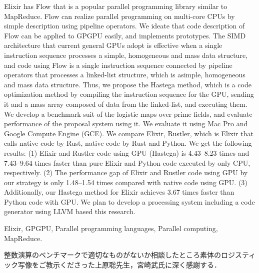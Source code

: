 \documentclass[submit,techrep]{ipsj}
\begin{document}
\begin{eabstract}
Elixir has Flow that is a popular parallel programming library similar to MapReduce. Flow can realize parallel programming on multi-core CPUs by simple description using pipeline operators. We ideate that code description of Flow can be applied to GPGPU easily, and implements prototypes. The SIMD architecture that current general GPUs adopt is effective when a single instruction sequence processes a simple, homogeneous and mass data structure, and code using Flow is a single instruction sequence connected by pipeline operators that processes a linked-list structure, which is asimple, homogeneous and mass data structure. Thus, we propose the Hastega method, which is a code optimization method by compiling the instruction sequence for the GPU, sending it and a mass array composed of data from the linked-list, and executing them. We develop a benchmark suit of the logistic maps over prime fields, and evaluate performance of the proposal system using it. We evaluate it using Mac Pro and Google Compute Engine (GCE). We compare Elixir, Rustler, which is Elixir that calls native code by Rust, native code by Rust and Python. We get the following results: (1) Elixir and Rustler code using GPU (Hastega) is 4.43--8.23 times and 7.43--9.64 times faster than pure Elixir and Python code executed by only CPU, respectively. (2) The performance gap of Elixir and Rustler code using GPU by our strategy is only 1.48--1.54 times compared with native code using GPU. (3) Additionally, our Hastega method for Elixir achieves 3.67 times faster than Python code with GPU. We plan to develop a processing system including a code generator using LLVM based this research.
\end{eabstract}

\begin{ekeyword}
Elixir, GPGPU, Parallel programming languages, Parallel computing, MapReduce.
\end{ekeyword}

\maketitle



\begin{acknowledgment}
整数演算のベンチマークで適切なものがないか相談したところ素体のロジスティック写像\cite{Miyazaki14}をご教示くださった上原聡先生，宮崎武氏に深く感謝する．
\end{acknowledgment}




\end{document}
